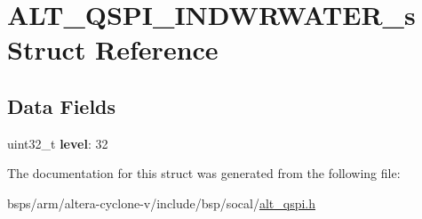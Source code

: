 \hypertarget{structALT__QSPI__INDWRWATER__s}{}\section{A\+L\+T\+\_\+\+Q\+S\+P\+I\+\_\+\+I\+N\+D\+W\+R\+W\+A\+T\+E\+R\+\_\+s Struct Reference}
\label{structALT__QSPI__INDWRWATER__s}
\subsection*{Data Fields}
\begin{DoxyCompactItemize}
\item 
\mbox{\label{structALT__QSPI__INDWRWATER__s_a61f319633906cd66fbe2beb697cac4ee}} 
uint32\+\_\+t {\bfseries level}\+: 32
\end{DoxyCompactItemize}


The documentation for this struct was generated from the following file\+:\begin{DoxyCompactItemize}
\item 
bsps/arm/altera-\/cyclone-\/v/include/bsp/socal/\mbox{\hyperlink{include_2bsp_2socal_2alt__qspi_8h}{alt\+\_\+qspi.\+h}}\end{DoxyCompactItemize}
